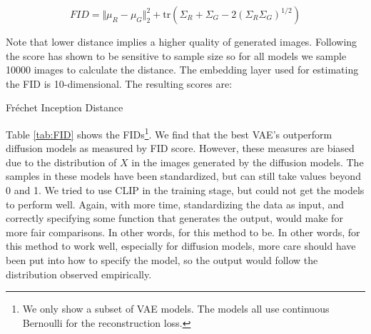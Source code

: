 \begin{equation}
    FID = \Vert \mu_R - \mu_G \Vert_2^2 + \mathrm{tr}(\Sigma_R + \Sigma_G - 2 (\Sigma_R \Sigma_G)^{1/2})
\end{equation}

Note that lower distance implies a higher quality of generated images. Following \cite[p. 775]{pml2Book} the score has shown to be sensitive to sample size so for all models we sample 10000 images to calculate the distance. The embedding layer used for estimating the FID is 10-dimensional. The resulting scores are:
\begin{table}[ht]
    \centering
    
    \caption{Fréchet Inception Distance}
    \label{tab:FID}
\end{table}

Table \ref{tab:FID} shows the FIDs\footnote{We only show a subset of VAE models. The models all use continuous Bernoulli for the reconstruction loss.}. We find that the best VAE's outperform diffusion models as measured by FID score. However, these measures are biased due to the distribution of $X$ in the images generated by the diffusion models. The samples in these models have been standardized, but can still take values beyond 0 and 1. We tried to use CLIP in the training stage, but could not get the models to perform well. Again, with more time, standardizing the data as input, and correctly specifying some function that generates the output, would make for more fair comparisons. In other words, for this method to be. In other words, for this method to work well, especially for diffusion models, more care should have been put into how to specify the model, so the output would follow the distribution observed empirically.